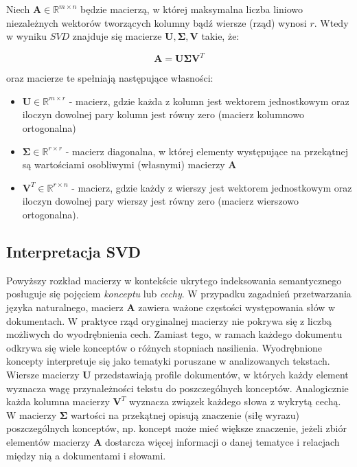 \documentclass{pracamgr}
\begin{document}
Niech $\mathbf{A} \in \mathbb{R}^{m \times n}$ będzie macierzą, w której maksymalna liczba liniowo niezależnych wektorów tworzących kolumny bądź wiersze (rząd) wynosi $r$. Wtedy w wyniku $SVD$ znajduje się macierze $\mathbf{U}, \mathbf{\Sigma}, \mathbf{V}$ takie, że:

\[
\mathbf{A} = \mathbf{U}\mathbf{\Sigma}\mathbf{V}^T
\]

oraz macierze te spełniają następujące własności:

\begin{itemize}
    \item $\mathbf{U} \in \mathbb{R}^{m \times r}$ - macierz, gdzie każda z kolumn jest wektorem jednostkowym oraz iloczyn dowolnej pary kolumn jest równy zero (macierz kolumnowo ortogonalna)
    \item $\mathbf{\Sigma} \in \mathbb{R}^{r \times r}$ - macierz diagonalna, w której elementy występujące na przekątnej są wartościami osobliwymi (własnymi) macierzy $\mathbf{A}$
    \item $\mathbf{V}^T \in \mathbb{R}^{r \times n}$ - macierz, gdzie każdy z wierszy jest wektorem jednostkowym oraz iloczyn dowolnej pary wierszy jest równy zero (macierz wierszowo ortogonalna).
\end{itemize}

\subsection{Interpretacja SVD}
Powyższy rozkład macierzy w kontekście ukrytego indeksowania semantycznego posługuje się pojęciem \textit{konceptu} lub \textit{cechy}. W przypadku zagadnień przetwarzania języka naturalnego, macierz $\mathbf{A}$ zawiera ważone częstości występowania słów w dokumentach. W praktyce rząd oryginalnej macierzy nie pokrywa się z liczbą możliwych do wyodrębnienia cech. Zamiast tego, w ramach każdego dokumentu odkrywa się wiele konceptów o różnych stopniach nasilienia. Wyodrębnione koncepty interpretuje się jako tematyki poruszane w analizowanych tekstach. Wiersze macierzy $\mathbf{U}$ przedstawiają profile dokumentów, w których każdy element wyznacza wagę przynależności tekstu do poszczególnych konceptów. Analogicznie każda kolumna macierzy $\mathbf{V}^T$ wyznacza związek każdego słowa z wykrytą cechą. W macierzy $\mathbf{\Sigma}$ wartości na przekątnej opisują znaczenie (siłę wyrazu) poszczególnych konceptów, np. koncept może mieć większe znaczenie, jeżeli zbiór elementów macierzy $\mathbf{A}$ dostarcza więcej informacji o danej tematyce i relacjach między nią a dokumentami i słowami. 
\end{document}
